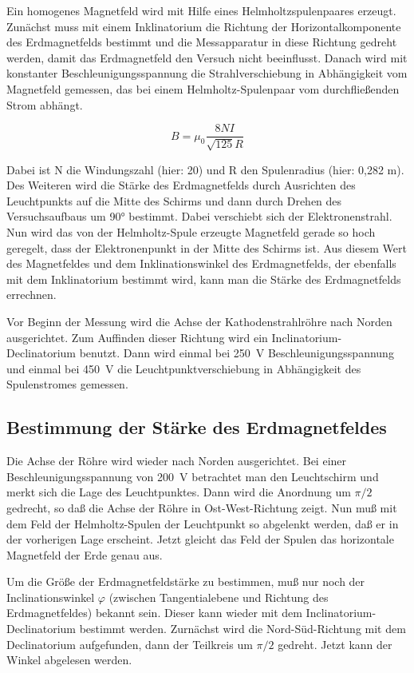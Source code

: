 Ein homogenes Magnetfeld wird mit Hilfe eines Helmholtzspulenpaares erzeugt. Zunächst muss
mit einem Inklinatorium die Richtung der Horizontalkomponente des Erdmagnetfelds bestimmt und die
Messapparatur in diese Richtung gedreht werden, damit das Erdmagnetfeld den Versuch nicht beeinflusst.
Danach wird mit konstanter Beschleunigungsspannung die Strahlverschiebung in Abhängigkeit vom Magnetfeld gemessen, das bei einem Helmholtz-Spulenpaar vom durchfließenden Strom abhängt.

\begin{equation}
B = \mu_0\frac{8 N I}{\sqrt{125}R}
\end{equation}

Dabei ist N die Windungszahl (hier: 20) und R den Spulenradius (hier: 0,282 m).
Des Weiteren wird die Stärke des Erdmagnetfelds durch Ausrichten des Leuchtpunkts auf die Mitte des Schirms und dann durch Drehen des Versuchsaufbaus um 90° bestimmt. Dabei verschiebt sich der Elektronenstrahl. Nun wird das von der Helmholtz-Spule erzeugte Magnetfeld
gerade so hoch geregelt, dass der Elektronenpunkt in der Mitte des Schirms ist. Aus diesem Wert des Magnetfeldes und dem Inklinationswinkel des Erdmagnetfelds, der ebenfalls mit dem Inklinatorium bestimmt wird, kann man die Stärke des Erdmagnetfelds errechnen.

Vor Beginn der Messung wird die Achse der Kathodenstrahlröhre nach
Norden ausgerichtet. Zum Auffinden dieser Richtung wird ein
Inclinatorium-Declinatorium benutzt. Dann wird einmal bei
\SI{250}{\volt} Beschleunigungsspannung und einmal bei \SI{450}{\volt}
die Leuchtpunktverschiebung in Abhängigkeit des Spulenstromes gemessen.

\subsection{Bestimmung der Stärke des Erdmagnetfeldes}

Die Achse der Röhre wird wieder nach Norden ausgerichtet. Bei einer
Beschleunigungsspannung von \SI{200}{\volt} betrachtet man den
Leuchtschirm und merkt sich die Lage des Leuchtpunktes. Dann wird die
Anordnung um $\pi/2$ gedrecht, so daß die Achse der Röhre in
Ost-West-Richtung zeigt. Nun muß mit dem Feld der
Helmholtz-Spulen der Leuchtpunkt so abgelenkt werden, daß er in
der vorherigen Lage erscheint. Jetzt gleicht das Feld der Spulen das
horizontale Magnetfeld der Erde genau aus.

Um die Größe der Erdmagnetfeldstärke zu bestimmen, muß nur noch der
Inclinationswinkel $\varphi$ (zwischen Tangentialebene und Richtung des
Erdmagnetfeldes) bekannt sein. Dieser kann wieder mit dem
Inclinatorium-Declinatorium bestimmt werden. Zurnächst wird die
Nord-Süd-Richtung mit dem Declinatorium aufgefunden, dann der Teilkreis
um $\pi/2$ gedreht. Jetzt kann der Winkel abgelesen werden.
